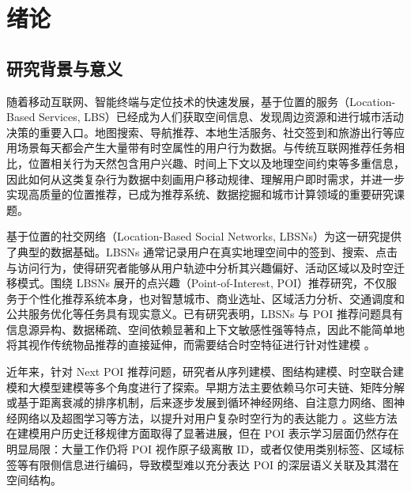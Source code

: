 \chapter{绪论}
\label{cha:introduction}

\section{研究背景与意义}
\label{sec:background}

随着移动互联网、智能终端与定位技术的快速发展，基于位置的服务（Location-Based Services, LBS）已经成为人们获取空间信息、发现周边资源和进行城市活动决策的重要入口。地图搜索、导航推荐、本地生活服务、社交签到和旅游出行等应用场景每天都会产生大量带有时空属性的用户行为数据。与传统互联网推荐任务相比，位置相关行为天然包含用户兴趣、时间上下文以及地理空间约束等多重信息，因此如何从这类复杂行为数据中刻画用户移动规律、理解用户即时需求，并进一步实现高质量的位置推荐，已成为推荐系统、数据挖掘和城市计算领域的重要研究课题。

基于位置的社交网络（Location-Based Social Networks, LBSNs）为这一研究提供了典型的数据基础。LBSNs 通常记录用户在真实地理空间中的签到、搜索、点击与访问行为，使得研究者能够从用户轨迹中分析其兴趣偏好、活动区域以及时空迁移模式。围绕 LBSNs 展开的点兴趣（Point-of-Interest, POI）推荐研究，不仅服务于个性化推荐系统本身，也对智慧城市、商业选址、区域活力分析、交通调度和公共服务优化等任务具有现实意义。已有研究表明，LBSNs 与 POI 推荐问题具有信息源异构、数据稀疏、空间依赖显著和上下文敏感性强等特点，因此不能简单地将其视作传统物品推荐的直接延伸，而需要结合时空特征进行针对性建模 \cite{zhao2016survey,sanchez2021survey}。


近年来，针对 Next POI 推荐问题，研究者从序列建模、图结构建模、时空联合建模和大模型建模等多个角度进行了探索。早期方法主要依赖马尔可夫链、矩阵分解或基于距离衰减的排序机制，后来逐步发展到循环神经网络、自注意力网络、图神经网络以及超图学习等方法，以提升对用户复杂时空行为的表达能力 \cite{feng2018deepmove,kang2018sasrec,luo2021stan,wang2022graph,yan2023sthgcn}。这些方法在建模用户历史迁移规律方面取得了显著进展，但在 POI 表示学习层面仍然存在明显局限：大量工作仍将 POI 视作原子级离散 ID，或者仅使用类别标签、区域标签等有限侧信息进行编码，导致模型难以充分表达 POI 的深层语义关联及其潜在空间结构。

